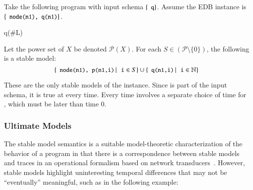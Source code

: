 \begin{example}
\label{ex:infinitemodels}
Take the following \lang program with input schema $\{\dedalus{q}\}$.  Assume the EDB instance is $\{\dedalus{node(n1), q(n1)}\}$.

\begin{Drules}
        {q(#L)}
\end{Drules}

Let the power set of $X$ be denoted $\mathcal{P}(X)$.  For each $S \in (\mathcal{P} \setminus \{0\})$, the following is a stable model:
$$\{\dedalus{node(n1), p(n1,i)} \, | \, \dedalus{i} \in S \} \cup \{{\dedalus{q(n1,i)} \, | \, \dedalus{i} \in \mathbb{N}}\}$$

These are the only stable models of the instance.  Since  is part of the input schema, it is true at every time.  Every time involves a separate choice of time for , which must be later than time 0.
\end{example}


\subsubsection{Ultimate Models}
The stable model semantics is a suitable model-theoretic characterization of the behavior of a program in that there is a correspondence between stable models and traces in an operational formalism based on network transducers~\cite{ameloot-operational}.  However, stable models highlight uninteresting temporal differences that may not be ``eventually'' meaningful, such as in the following example:

